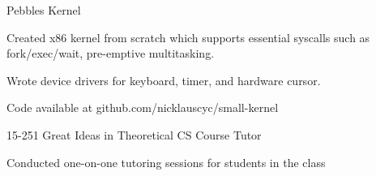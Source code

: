 
\vspace{-3.5mm}

\begin{cventries}

    \begin{multicols}{2}
  \cventry
    {} %
    {Pebbles Kernel} %
    {} %
    {} %
    {
      \begin{cvitems} %
        \item {Created x86 kernel from scratch which supports essential syscalls
          \newline such as fork/exec/wait, pre-emptive multitasking.
        \item Wrote device drivers for keyboard, timer, and hardware cursor.}
        \item {Code available at github.com/nicklauscyc/small-kernel}
      \end{cvitems}
    }


  \cventry
    {} %
{15-251 Great Ideas in Theoretical CS Course Tutor} %
    {}%
    {} %
    {
      \begin{cvitems} %
      \item {{Conducted one-on-one tutoring sessions for students in the class}}
      \end{cvitems}
    }




\end{multicols}
\end{cventries}
